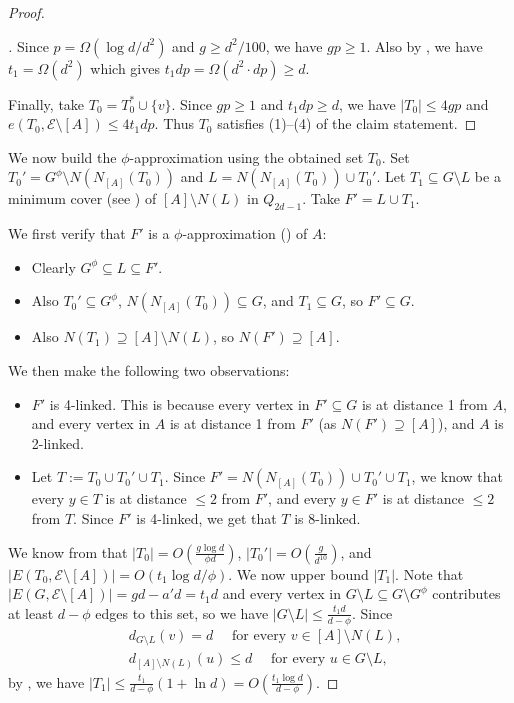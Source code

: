 \documentclass{amsart}
\newenvironment{subproof}[1][\proofname]{
  \renewcommand{\qedsymbol}{$\blacksquare$}
  \begin{proof}[#1]
}{
  \end{proof}
}
\theoremstyle{definition}
\newcommand{\cE}{\mathcal{E} }
\newcommand{\0}[0]{\emptyset}
\begin{document}
\begin{proof}
\begin{subproof}
    
    Since $p=\Omega(\log d/d^2)$ and $g\geq d^2/100$, we have $gp\geq 1$. Also by , we have $t_1=\Omega(d^2)$ which gives $t_1dp =\Omega(d^2\cdot dp) \geq d$.
    
    
    Finally, take $T_0=T_0^*\cup\{v\}$. Since $gp\geq 1$ and $t_1dp\geq d$, we have  $|T_0|\leq 4gp$ and $e(T_0,\cE\setminus[A])\leq 4t_1dp$. Thus $T_0$ satisfies (1)--(4) of the claim statement.
\end{subproof}

We now build the $\phi$-approximation using the obtained set $T_0$. Set $T_0'=G^\phi\setminus N(N_{[A]}(T_0))$  
and $L=N(N_{[A]}(T_0))\cup T_0'$. Let $T_1\subseteq G\setminus L$ be a minimum cover (see ) of $[A]\setminus N(L)$ in $Q_{2d-1}$. Take $F'=L\cup T_1$. 

We first verify that $F'$ is a $\phi$-approximation () of $A$:
\begin{itemize}
    \item Clearly $G^\phi\subseteq L\subseteq F'$. 
    \item Also $T_0'\subseteq G^\phi$, $N(N_{[A]}(T_0))\subseteq G$, and $T_1\subseteq G$, so $F'\subseteq G$.
    \item Also $N(T_1)\supseteq [A]\setminus N(L)$, so $N(F')\supseteq [A]$.
\end{itemize}

We then make the following two observations:
\begin{itemize}
    \item $F'$ is 4-linked. This is because every vertex in $F'\subseteq G$ is at distance 1 from $A$, and every vertex in $A$ is at distance 1 from $F'$ (as $N(F')\supseteq [A]$), and $A$ is 2-linked.
    \item Let $T:=T_0\cup T_0'\cup T_1$. Since $F'=N(N_{[A]}(T_0))\cup T_0'\cup T_1$, we know that every $y\in T$ is at distance $\leq 2$ from $F'$, and every $y\in F'$ is at distance $\leq 2$ from $T$. Since $F'$ is 4-linked, we get that $T$ is 8-linked.
\end{itemize}

We know from  that $|T_0|= O(\frac{g\log d}{\phi d})$, $|T_0'|= O(\frac{g}{d^{10}})$, and $|E(T_0,\cE\setminus[A])|= O(t_1\log d/\phi)$.
We now upper bound $|T_1|$. Note that $|E(G,\cE\setminus [A])|=gd-a'd=t_1d$ and every vertex in $G\setminus L\subseteq G\setminus G^\phi$ contributes at least $d-\phi$ edges to this set, so we have $|G\setminus L|\leq\frac{t_1d}{d-\phi}$. Since
\begin{align*}
    &d_{G\setminus L}(v)=d\quad \text{ for every } v\in [A]\setminus N(L),\\
    &d_{[A]\setminus N(L)}(u)\leq d\quad \text{ for every } u\in G\setminus L,
\end{align*}
by , we have $|T_1|\leq\frac{t_1}{d-\phi}(1+\ln d)=O(\frac{t_1\log d}{d-\phi})$.


\end{proof}
\end{document}
